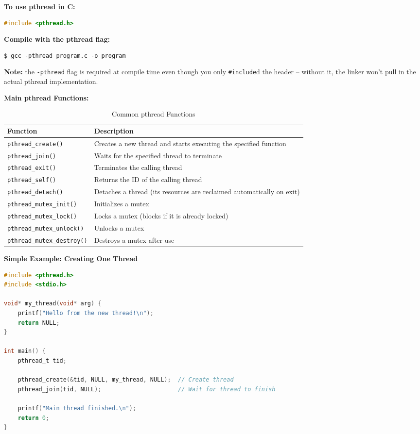 \textbf{To use pthread in C:} %
\begin{lstlisting}[language=C]
#include <pthread.h>
\end{lstlisting} %

\textbf{Compile with the pthread flag:} %
\begin{lstlisting}[language=Terminal]
$ gcc -pthread program.c -o program
\end{lstlisting} %
\textbf{Note:} the \texttt{-pthread} flag is required at compile time even though you only \texttt{\#include}d the header -- without it, the linker won't pull in the actual pthread implementation. %

\textbf{Main pthread Functions:} %
\begin{table}[h!]
\centering
\small
\renewcommand{\arraystretch}{1.3}
\begin{tabular}{|>{\raggedright\arraybackslash}p{5cm}|>{\raggedright\arraybackslash}p{9cm}|}
\hline
\textbf{Function} & \textbf{Description} \\ \hline
\texttt{pthread\_create()} & Creates a new thread and starts executing the specified function \\ \hline
\texttt{pthread\_join()} & Waits for the specified thread to terminate \\ \hline
\texttt{pthread\_exit()} & Terminates the calling thread \\ \hline
\texttt{pthread\_self()} & Returns the ID of the calling thread \\ \hline
\texttt{pthread\_detach()} & Detaches a thread (its resources are reclaimed automatically on exit) \\ \hline
\texttt{pthread\_mutex\_init()} & Initializes a mutex \\ \hline
\texttt{pthread\_mutex\_lock()} & Locks a mutex (blocks if it is already locked) \\ \hline
\texttt{pthread\_mutex\_unlock()} & Unlocks a mutex \\ \hline
\texttt{pthread\_mutex\_destroy()} & Destroys a mutex after use \\ \hline
\end{tabular}
\caption{Common pthread Functions}
\label{tab:pthread-functions}
\end{table} %

\textbf{Simple Example: Creating One Thread} %
\begin{lstlisting}[language=C]
#include <pthread.h>
#include <stdio.h>

void* my_thread(void* arg) {
    printf("Hello from the new thread!\n");
    return NULL;
}

int main() {
    pthread_t tid;

    pthread_create(&tid, NULL, my_thread, NULL);  // Create thread
    pthread_join(tid, NULL);                      // Wait for thread to finish

    printf("Main thread finished.\n");
    return 0;
}
\end{lstlisting} %

